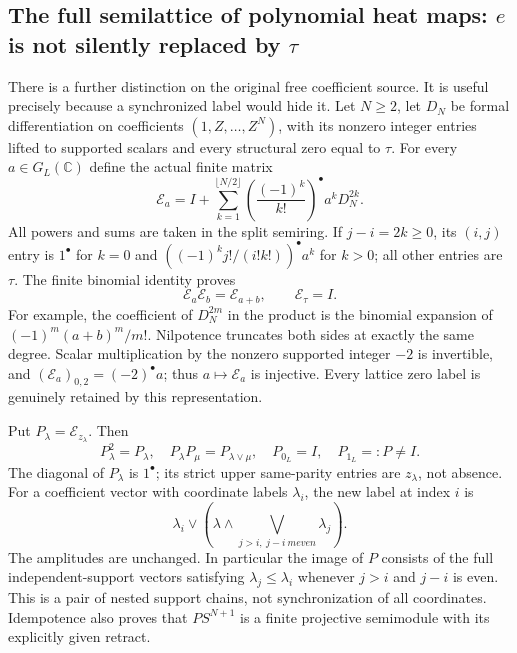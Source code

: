 \documentclass[11pt,a4paper]{article}
\theoremstyle{definition}\newtheorem{definition}[theorem]{Definition}\newtheorem{remark}[theorem]{Remark}
\newcommand{\C}{\mathbb C}\newcommand{\R}{\mathbb R}\newcommand{\Z}{\mathbb Z}\newcommand{\B}{\mathbb B}
\begin{document}
\subsection{The full semilattice of polynomial heat maps: $e$ is not silently replaced by $\tau$}
There is a further distinction on the original free coefficient source. It is useful precisely because a synchronized label would hide it. Let $N\ge2$, let $D_N$ be formal differentiation on coefficients $(1,Z,\ldots,Z^N)$, with its nonzero integer entries lifted to supported scalars and every structural zero equal to $\tau$. For every $a\in G_L(\C)$ define the actual finite matrix
\begin{equation}
 \mathcal E_a=I+\sum_{k=1}^{\lfloor N/2\rfloor}
       \left(\frac{(-1)^k}{k!}\right)^\bullet a^kD_N^{2k}.
                                                        \label{eq:splitexp}
\end{equation}
All powers and sums are taken in the split semiring. If $j-i=2k\ge0$, its $(i,j)$ entry is $1^\bullet$ for $k=0$ and
$( (-1)^k j!/(i!k!))^\bullet a^k$ for $k>0$; all other entries are $\tau$. The finite binomial identity proves
\begin{equation}
 \mathcal E_a\mathcal E_b=\mathcal E_{a+b},\qquad
 \mathcal E_\tau=I.                                     \label{eq:splitsemigroup}
\end{equation}
For example, the coefficient of $D_N^{2m}$ in the product is the binomial expansion of $(-1)^m(a+b)^m/m!$. Nilpotence truncates both sides at exactly the same degree. Scalar multiplication by the nonzero supported integer $-2$ is invertible, and $(\mathcal E_a)_{0,2}=(-2)^\bullet a$; thus $a\mapsto\mathcal E_a$ is injective. Every lattice zero label is genuinely retained by this representation.

Put $P_\lambda=\mathcal E_{z_\lambda}$. Then
\begin{equation}
 P_\lambda^2=P_\lambda,\quad
 P_\lambda P_\mu=P_{\lambda\vee\mu},\quad
 P_{0_L}=I,\quad P_{1_L}=:P\ne I.                      \label{eq:heatlabelprojectors}
\end{equation}
The diagonal of $P_\lambda$ is $1^\bullet$; its strict upper same-parity entries are $z_\lambda$, not absence. For a coefficient vector with coordinate labels $\lambda_i$, the new label at index $i$ is
\[
 \lambda_i\vee\left(\lambda\wedge
       \bigvee_{j>i,\ j-i\ {
m even}}\lambda_j\right).
\]
The amplitudes are unchanged. In particular the image of $P$ consists of the full independent-support vectors satisfying
$\lambda_j\le\lambda_i$ whenever $j>i$ and $j-i$ is even. This is a pair of nested support chains, not synchronization of all coordinates. Idempotence also proves that $PS^{N+1}$ is a finite projective semimodule with its explicitly given retract.
\end{document}
